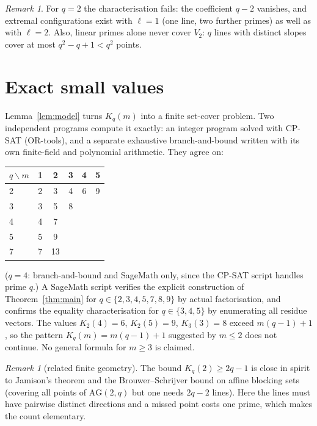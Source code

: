 \documentclass[11pt]{amsart}
\theoremstyle{remark}
\newtheorem{remark}[theorem]{Remark}
\begin{document}
\begin{remark}
For $q=2$ the characterisation fails: the coefficient $q-2$ vanishes, and extremal configurations exist with $\ell=1$ (one line, two
further primes) as well as with $\ell=2$. Also, linear primes alone
never cover $V_2$: $q$ lines with distinct slopes cover at most $q^2-q+1<q^2$ points.
\end{remark}

\section{Exact small values}
Lemma~\ref{lem:model} turns $K_q(m)$ into a finite set-cover problem. Two independent programs
compute it exactly: an integer program solved with CP-SAT (OR-tools), and a separate exhaustive
branch-and-bound written with its own finite-field and polynomial arithmetic. They agree on:

\begin{center}
\begin{tabular}{lccccc}
\toprule
$q\backslash m$ & 1 & 2 & 3 & 4 & 5\\
\midrule
2 & 2 & 3 & 4 & 6 & 9\\
3 & 3 & 5 & 8 & & \\
4 & 4 & 7 & & & \\
5 & 5 & 9 & & & \\
7 & 7 & 13 & & & \\
\bottomrule
\end{tabular}
\end{center}
($q=4$: branch-and-bound and SageMath only, since the CP-SAT script handles prime $q$.)
A SageMath script verifies the explicit construction of Theorem~\ref{thm:main} for
$q\in\{2,3,4,5,7,8,9\}$ by actual factorisation, and confirms the equality characterisation for
$q\in\{3,4,5\}$ by enumerating all residue vectors. The values $K_2(4)=6$, $K_2(5)=9$, $K_3(3)=8$
exceed $m(q-1)+1$, so the pattern $K_q(m)=m(q-1)+1$ suggested by $m\le2$ does not continue.
No general formula for $m\ge3$ is claimed.

\begin{remark}[related finite geometry]
The bound $K_q(2)\ge2q-1$ is close in spirit to Jamison's theorem and the Brouwer--Schrijver bound on
affine blocking sets \cite{jam} (covering all points of $\mathrm{AG}(2,q)$ but one needs $2q-2$ lines).
Here the lines must have pairwise distinct directions and a missed point costs one prime, which
makes the count elementary.
\end{remark}
\end{document}
